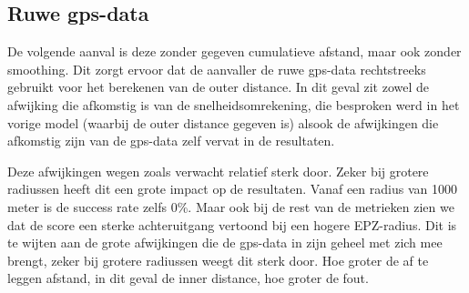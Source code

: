 \subsection{Ruwe gps-data}
De volgende aanval is deze zonder gegeven cumulatieve afstand, maar ook zonder
smoothing. Dit zorgt ervoor dat de aanvaller de ruwe \ac{gps}-data rechtstreeks
gebruikt voor het berekenen van de outer distance. In dit geval zit zowel de
afwijking die afkomstig is van de snelheidsomrekening, die besproken werd in
het vorige model (waarbij de outer distance gegeven is) alsook de afwijkingen
die afkomstig zijn van de \ac{gps}-data zelf vervat in de resultaten.

Deze afwijkingen wegen zoals verwacht relatief sterk door. Zeker bij grotere
radiussen heeft dit een grote impact op de resultaten. Vanaf een radius van
1000 meter is de success rate zelfs 0\%. Maar ook bij de rest van de metrieken
zien we dat de score een sterke achteruitgang vertoond bij een hogere
\ac{EPZ}-radius. Dit is te wijten aan de grote afwijkingen die de \ac{gps}-data
in zijn geheel met zich mee brengt, zeker bij grotere radiussen weegt dit sterk
door. Hoe groter de af te leggen afstand, in dit geval de inner distance, hoe
groter de fout.

